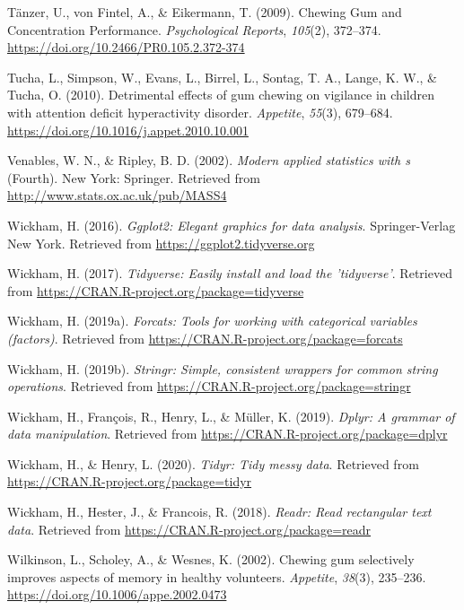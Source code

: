 \documentclass[english,man]{apa6}
\begin{document}
\leavevmode\hypertarget{ref-tanzerChewingGumConcentration2009}{}%
Tänzer, U., von Fintel, A., \& Eikermann, T. (2009). Chewing Gum and Concentration Performance. \emph{Psychological Reports}, \emph{105}(2), 372--374. \url{https://doi.org/10.2466/PR0.105.2.372-374}

\leavevmode\hypertarget{ref-tuchaDetrimentalEffectsGum2010}{}%
Tucha, L., Simpson, W., Evans, L., Birrel, L., Sontag, T. A., Lange, K. W., \& Tucha, O. (2010). Detrimental effects of gum chewing on vigilance in children with attention deficit hyperactivity disorder. \emph{Appetite}, \emph{55}(3), 679--684. \url{https://doi.org/10.1016/j.appet.2010.10.001}

\leavevmode\hypertarget{ref-R-MASS}{}%
Venables, W. N., \& Ripley, B. D. (2002). \emph{Modern applied statistics with s} (Fourth). New York: Springer. Retrieved from \url{http://www.stats.ox.ac.uk/pub/MASS4}

\leavevmode\hypertarget{ref-R-ggplot2}{}%
Wickham, H. (2016). \emph{Ggplot2: Elegant graphics for data analysis}. Springer-Verlag New York. Retrieved from \url{https://ggplot2.tidyverse.org}

\leavevmode\hypertarget{ref-R-tidyverse}{}%
Wickham, H. (2017). \emph{Tidyverse: Easily install and load the 'tidyverse'}. Retrieved from \url{https://CRAN.R-project.org/package=tidyverse}

\leavevmode\hypertarget{ref-R-forcats}{}%
Wickham, H. (2019a). \emph{Forcats: Tools for working with categorical variables (factors)}. Retrieved from \url{https://CRAN.R-project.org/package=forcats}

\leavevmode\hypertarget{ref-R-stringr}{}%
Wickham, H. (2019b). \emph{Stringr: Simple, consistent wrappers for common string operations}. Retrieved from \url{https://CRAN.R-project.org/package=stringr}

\leavevmode\hypertarget{ref-R-dplyr}{}%
Wickham, H., François, R., Henry, L., \& Müller, K. (2019). \emph{Dplyr: A grammar of data manipulation}. Retrieved from \url{https://CRAN.R-project.org/package=dplyr}

\leavevmode\hypertarget{ref-R-tidyr}{}%
Wickham, H., \& Henry, L. (2020). \emph{Tidyr: Tidy messy data}. Retrieved from \url{https://CRAN.R-project.org/package=tidyr}

\leavevmode\hypertarget{ref-R-readr}{}%
Wickham, H., Hester, J., \& Francois, R. (2018). \emph{Readr: Read rectangular text data}. Retrieved from \url{https://CRAN.R-project.org/package=readr}

\leavevmode\hypertarget{ref-wilkinsonChewingGumSelectively2002}{}%
Wilkinson, L., Scholey, A., \& Wesnes, K. (2002). Chewing gum selectively improves aspects of memory in healthy volunteers. \emph{Appetite}, \emph{38}(3), 235--236. \url{https://doi.org/10.1006/appe.2002.0473}

\endgroup
\end{document}
